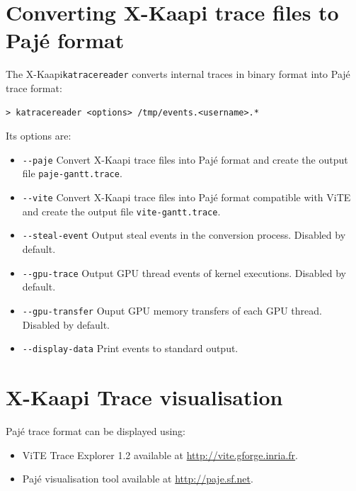 \documentclass{article}[12pt]
\newcommand{\kaapi}{\textsc{X}-Kaapi\xspace}
\begin{document}
\section{Converting \kaapi trace files to Paj\'e format} \label{sec:convert}

The \kaapi \texttt{katracereader} converts internal traces in binary format
into Paj\'e trace format:
\begin{verbatim}
> katracereader <options> /tmp/events.<username>.*
\end{verbatim}
Its options are:
\begin{itemize} %
\item \verb+--paje+\newline
Convert \kaapi trace files into Paj\'e format and create the output file \texttt{paje-gantt.trace}.
\item \verb+--vite+\newline
Convert \kaapi trace files into Paj\'e format compatible with ViTE and create the output file \texttt{vite-gantt.trace}.
\item \verb+--steal-event+\newline
Output steal events in the conversion process. Disabled by default.
\item \verb+--gpu-trace+\newline
Output GPU thread events of kernel executions. Disabled by default.
\item \verb+--gpu-transfer+\newline
Ouput GPU memory transfers of each GPU thread. Disabled by default.
\item \verb+--display-data+\newline
Print events to standard output.
\end{itemize} %

\section{\kaapi Trace visualisation} \label{sec:visualisation}

Paj\'e trace format can be displayed using:
\begin{itemize}
\item ViTE Trace Explorer 1.2 available at \url{http://vite.gforge.inria.fr}.
\item Paj\'e visualisation tool available at \url{http://paje.sf.net}.
\end{itemize}
\end{document}
